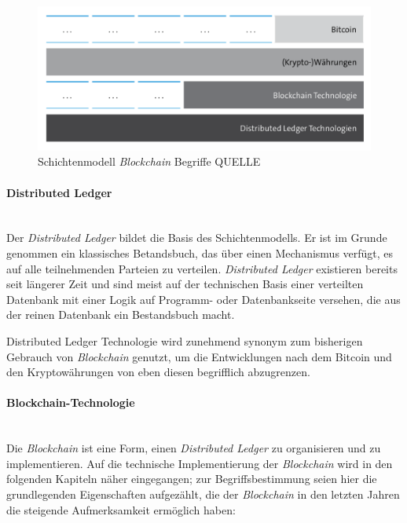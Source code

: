 \begin{figure}[h!]
	\centering
	\includegraphics[width=1.0\linewidth]{pictures/layer-model-blockchain}
	\caption[Schichtenmodell \textit{Blockchain} Begriffe]{Schichtenmodell \textit{Blockchain} Begriffe QUELLE}
	\label{fig:layer-model-blockchain}
\end{figure}

\paragraph{Distributed Ledger}$~~$\\
Der \textit{Distributed Ledger} bildet die Basis des Schichtenmodells. Er ist im Grunde genommen ein klassisches Betandsbuch, das über einen Mechanismus verfügt, es auf alle teilnehmenden Parteien zu verteilen. \textit{Distributed Ledger} existieren bereits seit längerer Zeit und sind meist auf der technischen Basis einer verteilten Datenbank mit einer Logik auf Programm- oder Datenbankseite versehen, die aus der reinen Datenbank ein Bestandsbuch macht.

Distributed Ledger Technologie wird zunehmend synonym zum bisherigen Gebrauch von \textit{Blockchain} genutzt, um die Entwicklungen nach dem Bitcoin und den Kryptowährungen von eben diesen begrifflich abzugrenzen.

\paragraph{Blockchain-Technologie}$~~$\\
Die \textit{Blockchain} ist eine Form, einen \textit{Distributed Ledger} zu organisieren und zu implementieren. Auf die technische Implementierung der \textit{Blockchain} wird in den folgenden Kapiteln näher eingegangen; zur Begriffsbestimmung seien hier die grundlegenden Eigenschaften aufgezählt, die der \textit{Blockchain} in den letzten Jahren die steigende Aufmerksamkeit ermöglich haben:

